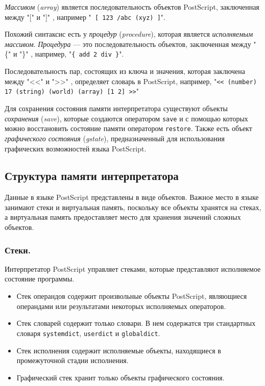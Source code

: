 \textit{Массивом} (\textit{array}) является последовательность объектов PostScript, заключенная между "[" и "]" $ $, например "\texttt{ [ 123  /abc (xyz) ]}".

Похожий синтаксис есть у \textit{процедур } (\textit{procedure}), которая является \textit{исполняемым массивом}. \textit{Процедура} --- это последовательность объектов, заключенная между "\{" и "\}"$ $ , например, "\texttt{\{ add 2 div \}}".

Последовательность пар, состоящих из ключа и значения, которая заключена между "$ $<<" и "$ $>>"$ $ , определяет словарь в PostScript, например, "\texttt {<< (number) 17 (string) (world) (array) [1 2]  >>}"

Для сохранения состояния памяти интерпретатора существуют объекты \textit{сохранения} (\textit{save}), которые создаются оператором \texttt{save} и с помощью которых можно восстановить состояние памяти оператором \texttt{restore}. Также есть объект \textit{графического состояния} (\textit{gstate}), предназначенный для использования графических возможностей языка PostScript.

\subsection{Структура памяти интерпретатора}
Данные в языке PostScript представлены в виде объектов. Важное место в языке занимают стеки и виртуальная память, поскольку все объекты хранятся на стеках, а виртуальная память предоставляет место для хранения значений сложных объектов.
\subsubsection{Стеки.}
Интерпретатор PostScript управляет стеками, которые представляют исполняемое состояние программы. 
\begin{itemize}
\item Стек операндов содержит произвольные объекты PostScript, являющиеся операндами или результатами некоторых исполняемых операторов.
\item Стек словарей содержит только словари. В нем содержатся три стандартных словаря \texttt{systemdict}, \texttt{userdict} и \texttt{globaldict}.
\item Стек исполнения содержит исполняемые объекты, находящиеся в промежуточной стадии исполнения.
\item Графический стек хранит только объекты графического состояния.
\end{itemize}

